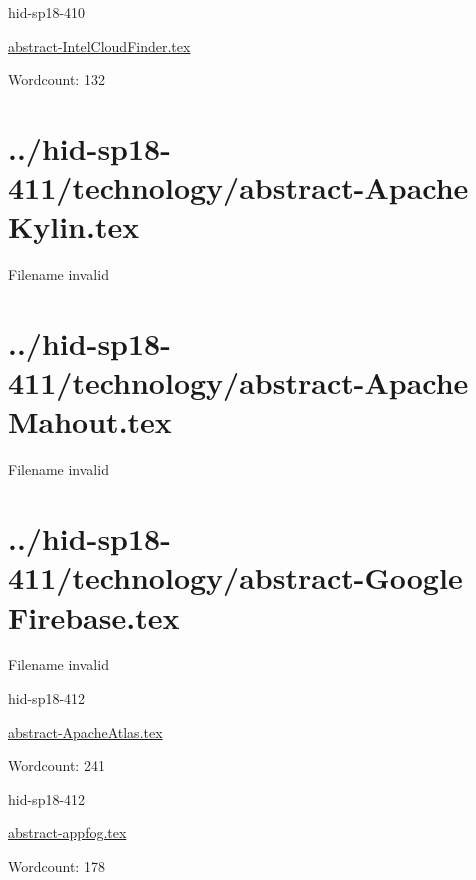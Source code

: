 

\begin{IU}

hid-sp18-410

\href{https://github.com/cloudmesh-community/hid-sp18-410/blob/master//technology/abstract-IntelCloudFinder.tex}{abstract-IntelCloudFinder.tex}

 

Wordcount: 132

\end{IU}

\section{../hid-sp18-411/technology/abstract-Apache Kylin.tex}
Filename invalid
\section{../hid-sp18-411/technology/abstract-Apache Mahout.tex}
Filename invalid
\section{../hid-sp18-411/technology/abstract-Google Firebase.tex}
Filename invalid


\begin{IU}

hid-sp18-412

\href{https://github.com/cloudmesh-community/hid-sp18-412/blob/master//technology/abstract-ApacheAtlas.tex}{abstract-ApacheAtlas.tex}

 

Wordcount: 241

\end{IU}



\begin{IU}

hid-sp18-412

\href{https://github.com/cloudmesh-community/hid-sp18-412/blob/master//technology/abstract-appfog.tex}{abstract-appfog.tex}

 

Wordcount: 178

\end{IU}



